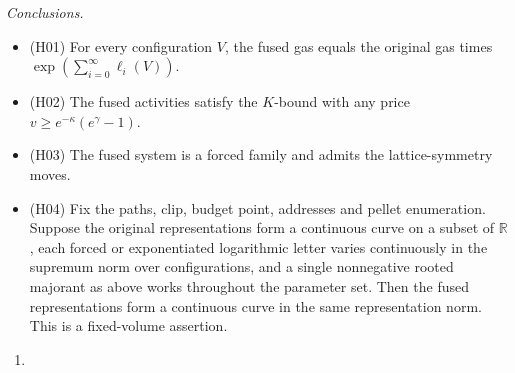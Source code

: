 \documentclass[
  letterpaper,
  11pt]{article}
\providecommand{\tightlist}{%
  \setlength{\itemsep}{0pt}\setlength{\parskip}{0pt}}
\begin{document}
\emph{Conclusions.}

\begin{itemize}
\tightlist
\item
  (H01) For every configuration \(V\), the fused gas equals the original
  gas times \(\exp(\sum_{i=0}^\infty\ell_i(V))\).
\item
  (H02) The fused activities satisfy the \(K\)-bound with any price
  \(v\ge e^{-\kappa}(e^\gamma-1)\).
\item
  (H03) The fused system is a forced family and admits the
  lattice-symmetry moves.
\item
  (H04) Fix the paths, clip, budget point, addresses and pellet
  enumeration. Suppose the original representations form a continuous
  curve on a subset of \(\mathbb R\), each forced or exponentiated
  logarithmic letter varies continuously in the supremum norm over
  configurations, and a single nonnegative rooted majorant as above
  works throughout the parameter set. Then the fused representations
  form a continuous curve in the same representation norm. This is a
  fixed-volume assertion.
\end{itemize}

\begin{enumerate}
\def\labelenumi{(\Roman{enumi})}
\tightlist
\item
\end{enumerate}
\end{document}
